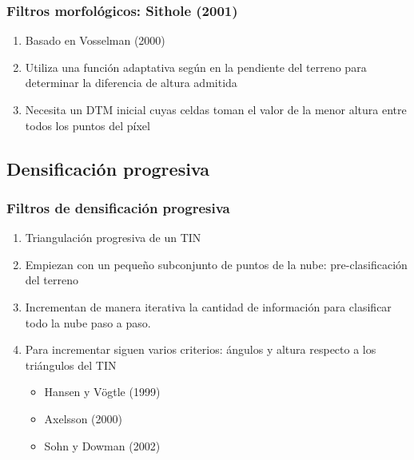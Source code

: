 \begin{frame}
  \frametitle{Filtros morfológicos: Sithole (2001)}
  \begin{enumerate}
    \item Basado en Vosselman (2000)
    \item Utiliza una función adaptativa según en la pendiente del terreno 
      para determinar la diferencia de altura admitida
    \item Necesita un DTM inicial cuyas celdas toman el valor de la menor altura
      entre todos los puntos del píxel
  \end{enumerate}
\end{frame}
\subsection{Densificación progresiva}
\begin{frame}
  \frametitle{Filtros de densificación progresiva}
  \begin{enumerate}
    \item Triangulación progresiva de un TIN 
    \item Empiezan con un pequeño subconjunto de puntos de la nube: pre-clasificación del terreno
    \item Incrementan de manera iterativa la cantidad de información para
      clasificar todo la nube paso a paso.
    \item Para incrementar siguen varios criterios: ángulos y altura respecto a
      los triángulos del TIN
      \begin{itemize}
        \item Hansen y Vögtle (1999)
        \item Axelsson (2000)
        \item Sohn y Dowman (2002)
      \end{itemize}
  \end{enumerate}
\end{frame}
